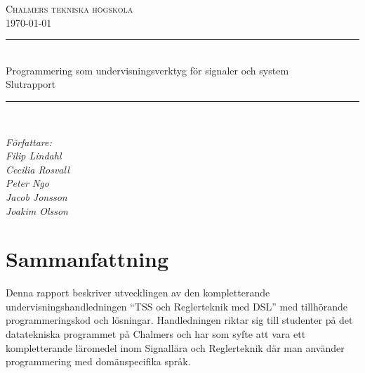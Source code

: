 \documentclass[]{article}
\date{\today}
\begin{document}
\renewcommand*\abstractname{Sammandrag}

\begin{titlepage} \newcommand{\HRule}{\rule{\linewidth}{0.3mm}}
\center
\textsc{\Large Chalmers tekniska högskola}\\[0.05cm]
\normalsize \today

\HRule \\[0.08cm]
{\large  Programmering som undervisningsverktyg för signaler och system \\ \normalsize{Slutrapport}}\\[0.08cm] %
\HRule \\[0.3cm]

\vfill

\begin{flushleft} \small
    \emph{Författare: \\
    \quad Filip Lindahl\\
    \quad Cecilia Rosvall\\
    \quad Peter Ngo\\
    \quad Jacob Jonsson\\
    \quad Joakim Olsson\\}
\end{flushleft}
\end{titlepage}
\newpage

\begin{abstract}
\end{abstract}
\newpage



\newpage
\tableofcontents

\newpage

\setlength{\parskip}{2mm}
\setlength{\parindent}{0pt}


\section{Sammanfattning}

Denna rapport beskriver utvecklingen av den kompletterande undervisningshandledningen “TSS och Reglerteknik med DSL” med tillhörande programmeringskod och lösningar. Handledningen riktar sig till studenter på det datatekniska programmet på Chalmers och har som syfte att vara ett kompletterande läromedel inom Signallära och Reglerteknik där man använder programmering med domänspecifika språk.
\end{document}
